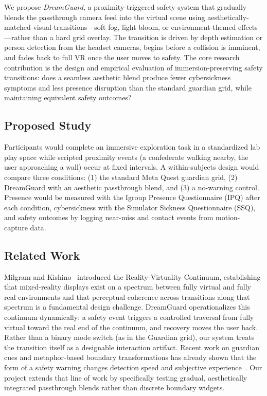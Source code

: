 \documentclass{styling/vgtc}                          %
\begin{document}
We propose \emph{DreamGuard}, a proximity-triggered safety system that
gradually blends the passthrough camera feed into the virtual scene using
aesthetically-matched visual transitions---soft fog, light bloom, or
environment-themed effects---rather than a hard grid overlay. The transition
is driven by depth estimation or person detection from the headset cameras,
begins before a collision is imminent, and fades back to full VR once the
user moves to safety. The core research contribution is the design and
empirical evaluation of immersion-preserving safety transitions: does a
seamless aesthetic blend produce fewer cybersickness symptoms and less
presence disruption than the standard guardian grid, while maintaining
equivalent safety outcomes?

\subsection{Proposed Study}

Participants would complete an immersive exploration task in a
standardized lab play space while scripted proximity events (a confederate
walking nearby, the user approaching a wall) occur at fixed intervals.
A within-subjects design would compare three conditions: (1) the standard
Meta Quest guardian grid, (2) DreamGuard with an aesthetic passthrough
blend, and (3) a no-warning control. Presence would be measured with the
Igroup Presence Questionnaire (IPQ) after each condition, cybersickness with
the Simulator Sickness Questionnaire (SSQ), and safety outcomes by logging
near-miss and contact events from motion-capture data.

\subsection{Related Work}

Milgram and Kishino~\cite{milgram:1994:taxonomy} introduced the
Reality-Virtuality Continuum, establishing that mixed-reality displays
exist on a spectrum between fully virtual and fully real environments and
that perceptual coherence across transitions along that spectrum is a
fundamental design challenge. DreamGuard operationalizes this continuum
dynamically: a safety event triggers a controlled traversal from fully
virtual toward the real end of the continuum, and recovery moves the user
back. Rather than a binary mode switch (as in the Guardian grid), our
system treats the transition itself as a designable interaction artifact.
Recent work on guardian cues and metaphor-based boundary transformations has
already shown that the form of a safety warning changes detection speed and
subjective experience~\cite{wu2023guardian,qin2024brokenwall}. Our project
extends that line of work by specifically testing gradual, aesthetically
integrated passthrough blends rather than discrete boundary widgets.
\end{document}
